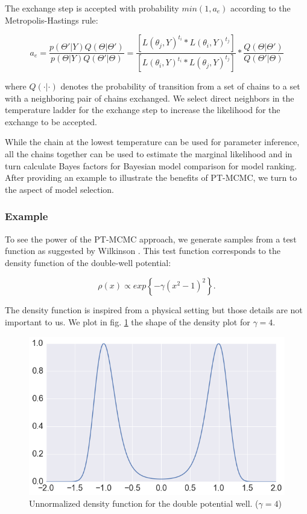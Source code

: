 The exchange step is accepted with probability $min(1, a_{e})$ according to the Metropolis-Hastings rule:

$$a_{e} = \frac{p(\Theta '|Y)Q(\Theta | \Theta ')}{p(\Theta |Y)Q(\Theta '| \Theta)} = \frac{[L(\theta_{j},Y)^{t_i}*L(\theta_{i},Y)^{t_j}]}{[L(\theta_{i},Y)^{t_i}*L(\theta_{j},Y)^{t_j}]}* \frac{Q(\Theta | \Theta ')}{Q(\Theta '| \Theta)}$$

where $Q(\cdot |\cdot )$ denotes the probability of transition from a set of chains to a set with a neighboring pair of chains exchanged. We select direct neighbors in the temperature ladder for the exchange step to increase the likelihood for the exchange to be accepted. 

While the chain at the lowest temperature can be used for parameter inference, all the chains together can be used to estimate the marginal likelihood \cite{calderhead10} and in turn calculate Bayes factors for Bayesian model comparison for model ranking. After providing an example to illustrate the benefits of PT-MCMC, we turn to the aspect of model selection.

\subsubsection{Example}

To see the power of the PT-MCMC approach, we generate samples from a test function as suggested by Wilkinson \cite{wilkinson}. This test function corresponds to the density function of the double-well potential:

$$\rho(x) \propto exp \left \{ - \gamma (x^2 - 1)^2 \right \}.$$

The density function is inspired from a physical setting but those details are not important to us. We plot in fig. \ref{fig:density} the shape of the density plot for $\gamma = 4$.

\begin{figure}[h!]
\centering
\includegraphics[scale=0.55]{embryo/density_plot.png}
\caption{Unnormalized density function for the double potential well. ($\gamma = 4$)}
\label{fig:density}
\end{figure}


